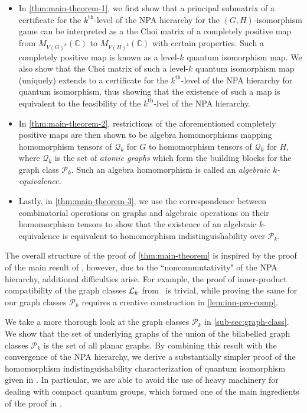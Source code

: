 \documentclass[11pt,a4paper]{article}
\theoremstyle{plain}
\theoremstyle{remark}
\theoremstyle{definition}
\newcommand{\complex}{\mathbb{C}}
\def\calP{{\mathcal P}} \def\calQ{{\mathcal Q}} \def\calR{{\mathcal R}}
\begin{document}
\begin{itemize}
    \item In \cref{thm:main-theorem-1}, we first show that a principal submatrix of a certificate for the $k^{\text{th}}$-level of the NPA hierarchy for the $(G,H)$-isomorphism game can be interpreted as a the Choi matrix of a completely positive map from $M_{V(G)^k}(\complex)$ to $M_{V(H)^k}(\complex)$ with certain properties. Such a completely positive map is known as a level-$k$ quantum isomorphism map. We also show that the Choi matrix of such a level-$k$ quantum isomorphism map (uniquely) extends to a certificate for the $k^{\text{th}}$-level of the NPA hierarchy for quantum isomorphism, thus showing that the existence of such a map is equivalent to the feasibility of the $k^{\text{th}}$-lvel of the NPA hierarchy.  

    \item In \cref{thm:main-theorem-2}, restrictions of the aforementioned completely positive maps are then shown to be algebra homomorphisms mapping homomorphism tensors of $\calQ_k$ for $G$ to homomorphism tensors of $\calQ_k$ for $H$, where $\calQ_k$ is the set of \emph{atomic graphs} which form the building blocks for the graph class $\calP_k$. Such an algebra homomorphism is called an \emph{algebraic $k$-equivalence.}

    \item Lastly, in \cref{thm:main-theorem-3}, we use the correspondence between combinatorial operations on graphs and algebraic operations on their homomorphism tensors to show that the existence of an algebraic $k$-equivalence is equivalent to homomorphism indistinguishability over $\calP_k$.  
\end{itemize}

The overall structure of the proof of \cref{thm:main-theorem} is inspired by the proof of the main result of \cite{roberson-seppelt-arxiv}, however, due to the ``noncommutativity" of the NPA hierarchy, additional difficulties arise. For example, the proof of inner-product compatibility of the graph classes ${\mathcal L}_k$ from~\cite{roberson-seppelt-arxiv} is trivial, while proving the same for our graph classes $\calP_k$ requires a creative construction in \cref{lem:inn-pro-comp}.    

We take a more thorough look at the graph classes $\calP_k$ in \cref{sub-sec:graph-class}. We show that the set of underlying graphs of the union of the bilabelled graph classes $\calP_k$ is the set of all planar graphs. By combining this result with the convergence of the NPA hierarchy, 
we derive a substantially simpler proof of the homomorphism indistinguishability characterization of quantum isomorphism given in \cite{david-laura}. 
In particular, we are able to avoid the use of heavy machinery for dealing with compact quantum groups, which formed one of the main ingredients of the proof in \cite{david-laura}.   
\end{document}
